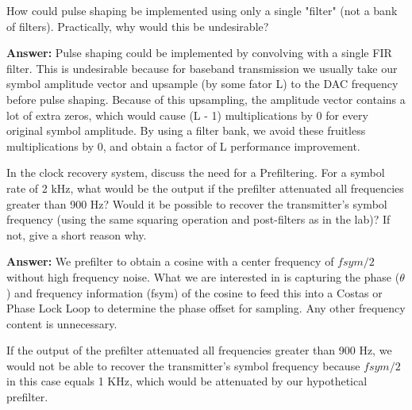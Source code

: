 \documentclass{article}
\begin{document}
\begin{enumerate}
  \begin{item}
		How could pulse shaping be implemented using only a single "filter" (not a bank of filters). Practically, why would this be undesirable?

  \textbf{Answer:}
		Pulse shaping could be implemented by convolving with a single FIR filter. This is undesirable because for baseband transmission we usually take our symbol amplitude vector and upsample (by some fator L) to the DAC frequency before pulse shaping. Because of this upsampling, the amplitude vector contains a lot of extra zeros, which would cause (L - 1) multiplications by 0 for every original symbol amplitude. By using a filter bank, we avoid these
		fruitless multiplications by 0, and obtain a factor of L performance improvement.
  \end{item}

  \begin{item}
		In the clock recovery system, discuss the need for a Prefiltering. For a symbol rate of 2 kHz, what would be the output if the prefilter attenuated all frequencies greater than 900 Hz? Would it be possible to recover the transmitter's symbol frequency (using the same squaring operation and post-filters as in the lab)? If not, give a short reason why.

  \textbf{Answer:}
		We prefilter to obtain a cosine with a center frequency of $fsym/2$ without high frequency noise. What we are interested in is capturing the phase ($\theta$) and frequency information (fsym) of the cosine to feed this into a Costas or Phase Lock Loop to determine the phase offset for sampling. Any other frequency content is unnecessary.

		If the output of the prefilter attenuated all frequencies greater than 900 Hz, we would not be able to recover the transmitter's symbol frequency because $fsym/2$ in this case equals 1 KHz, which would be attenuated by our hypothetical prefilter.
  \end{item}

\end{enumerate}





\end{document}
